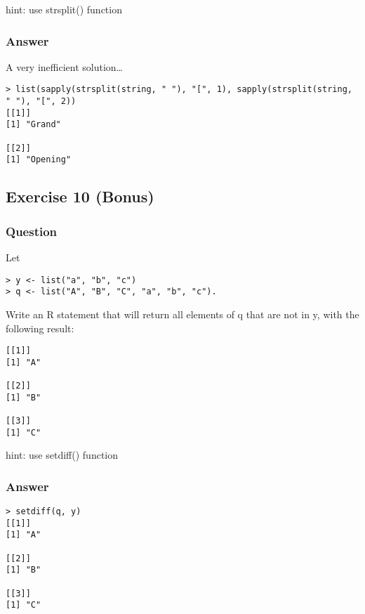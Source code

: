 \documentclass[11pt]{article}
\begin{document}
hint:  use strsplit() function
\subsubsection{Answer}
\label{sec:orgdbc3f9e}
A very inefficient solution\ldots{}
\begin{verbatim}
> list(sapply(strsplit(string, " "), "[", 1), sapply(strsplit(string, " "), "[", 2))
[[1]]
[1] "Grand"

[[2]]
[1] "Opening"
\end{verbatim}

\subsection{Exercise 10 (Bonus)}
\label{sec:orgd7027b4}
\subsubsection{Question}
\label{sec:org049e7ac}
Let
\begin{verbatim}
> y <- list("a", "b", "c")
> q <- list("A", "B", "C", "a", "b", "c").
\end{verbatim}

Write an R statement that will return all elements of q that are not in y, with the following result:
\begin{verbatim}
[[1]]
[1] "A"

[[2]]
[1] "B"

[[3]]
[1] "C"
\end{verbatim}

hint:  use setdiff() function
\subsubsection{Answer}
\label{sec:org4e0fc32}
\begin{verbatim}
> setdiff(q, y)
[[1]]
[1] "A"

[[2]]
[1] "B"

[[3]]
[1] "C"
\end{verbatim}
\end{document}
